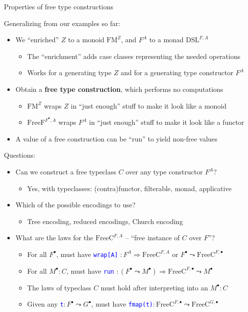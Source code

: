 \documentclass[english,,russian]{beamer}
\begin{document}
\begin{frame}{Properties of free type constructions}

Generalizing from our examples so far:
\begin{itemize}
\item We ``enriched'' $Z$ to a monoid $\text{FM}^{Z}$, and $F^{A}$
to a monad $\text{DSL}^{F,A}$ 
\begin{itemize}
\item The ``enrichment'' adds case classes representing the needed operations
\item Works for a generating type $Z$ and for a generating type constructor
$F^{A}$
\end{itemize}
\item Obtain a \textbf{free type construction}, which performs no computations
\begin{itemize}
\item $\text{FM}^{Z}$ wraps $Z$ in ``just enough'' stuff to make it
look like a monoid
\item $\text{FreeF}^{F^{\bullet},A}$ wraps $F^{A}$ in ``just enough''
stuff to make it look like a functor
\end{itemize}
\item A value of a free construction can be ``run'' to yield non-free
values 
\end{itemize}
Questions:
\begin{itemize}
\item Can we construct a free typeclass $C$ over any type constructor $F^{A}$?
\begin{itemize}
\item Yes, with typeclasses: (contra)functor, filterable, monad, applicative
\end{itemize}
\item Which of the possible encodings to use?
\begin{itemize}
\item Tree encoding, reduced encodings, Church encoding
\end{itemize}
\item What are the laws for the $\text{FreeC}^{F,A}$ -- ``free instance
of $C$ over $F$''?
\begin{itemize}
\item For all $F^{\bullet}$, must have \texttt{\textcolor{blue}{\footnotesize{}wrap{[}A{]}}}
$:F^{A}\Rightarrow\text{FreeC}^{F,A}$ or $F^{\bullet}\leadsto\text{FreeC}^{F,\bullet}$
\item For all $M^{\bullet}:C$, must have \texttt{\textcolor{blue}{\footnotesize{}run}}
$:\left(F^{\bullet}\leadsto M^{\bullet}\right)\Rightarrow\text{FreeC}^{F,\bullet}\leadsto M^{\bullet}$
\item The laws of typeclass $C$ must hold after interpreting into an $M^{\bullet}:C$
\item Given any \texttt{\textcolor{blue}{\footnotesize{}t}}$:F^{\bullet}\leadsto G^{\bullet}$,
must have \texttt{\textcolor{blue}{\footnotesize{}fmap(t)}}$:\text{FreeC}^{F,\bullet}\leadsto\text{FreeC}^{G,\bullet}$
\end{itemize}
\end{itemize}
\end{frame}
\end{document}

